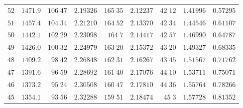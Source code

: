 \begin{center}
\begin{tabular}{r|r|r|r|r|r|r|r|r}
$52$&$1471.9$&$106\;47$&$2.19326$&$165\;35$&$2.12237$&$42\;12$&$1.41996$&$0.57295$\\
$51$&$1457.4$&$104\;34$&$2.21210$&$164\;52$&$2.13370$&$42\;34$&$1.44546$&$0.61107$\\[2pt]
$50$&$1442.1$&$102\;29$&$2.23098$&$164\;7$&$2.14417$&$42\;57$&$1.46990$&$0.64787$\\
$49$&$1426.0$&$100\;32$&$2.24979$&$163\;20$&$2.15372$&$43\;20$&$1.49327$&$0.68335$\\
$48$&$1409.2$&$98\;42$&$2.26848$&$162\;31$&$2.16267$&$43\;45$&$1.51567$&$0.71762$\\
$47$&$1391.6$&$96\;59$&$2.28692$&$161\;40$&$2.17076$&$44\;10$&$1.53711$&$0.75071$\\
$46$&$1373.2$&$95\;24$&$2.30508$&$160\;47$&$2.17810$&$44\;36$&$1.55764$&$0.78266$\\[2pt]
$45$&$1354.1$&$93\;56$&$2.32288$&$159\;51$&$2.18474$&$45\;3$&$1.57728$&$0.81352$\\
\hline
\end{tabular}
\end{center}
\endgroup
\clearpage
{}
\begingroup
\fontsize{9}{10.2}\selectfont
\setlength{\tabcolsep}{1.5pt}
\renewcommand{\arraystretch}{1.02}
